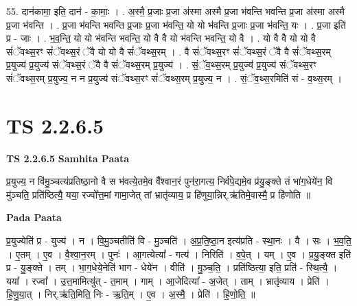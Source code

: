 \documentclass[17pt]{extarticle}
\begin{document}
55. दान॑कामा॒ इति॒ दान॑ - का॒माः॒ । . अ॒स्मै॒ प्र॒जाः प्र॒जा अ॑स्मा अस्मै प्र॒जा भ॑वन्ति भवन्ति प्र॒जा अ॑स्मा अस्मै प्र॒जा भ॑वन्ति । . प्र॒जा भ॑वन्ति भवन्ति प्र॒जाः प्र॒जा भ॑वन्ति॒ यो यो भ॑वन्ति प्र॒जाः प्र॒जा भ॑वन्ति॒ यः । . प्र॒जा इति॑ प्र - जाः । . भ॒व॒न्ति॒ यो यो भ॑वन्ति भवन्ति॒ यो वै वै यो भ॑वन्ति भवन्ति॒ यो वै । . यो वै वै यो यो वै सं॑ॅवथ्स॒रꣳ सं॑ॅवथ्स॒रं ॅवै यो यो वै सं॑ॅवथ्स॒रम् । . वै सं॑ॅवथ्स॒रꣳ सं॑ॅवथ्स॒रं ॅवै वै सं॑ॅवथ्स॒रम् प्र॒युज्य॑ प्र॒युज्य॑ संॅवथ्स॒रं ॅवै वै सं॑ॅवथ्स॒रम् प्र॒युज्य॑ । . सं॒ॅव॒थ्स॒रम् प्र॒युज्य॑ प्र॒युज्य॑ संॅवथ्स॒रꣳ सं॑ॅवथ्स॒रम् प्र॒युज्य॒ न न प्र॒युज्य॑ संॅवथ्स॒रꣳ सं॑ॅवथ्स॒रम् प्र॒युज्य॒ न । . सं॒ॅव॒थ्स॒रमिति॑ सं - व॒थ्स॒रम् । \newline
\pagebreak
{}

\section{ TS 2.2.6.5 }

\textbf{TS 2.2.6.5 } \newline
\textbf{Samhita Paata} \newline

प्र॒युज्य॒ न वि॑मु॒ञ्चत्य॑प्रतिष्ठा॒नो वै स भ॑वत्ये॒तमे॒व वै᳚श्वान॒रं पुन॑रा॒गत्य॒ निर्व॑पे॒द्यमे॒व प्र॑यु॒ङ्क्ते तं भा॑ग॒धेये॑न॒ वि मु॑ञ्चति॒ प्रति॑ष्ठित्यै॒ यया॒ रज्वो᳚त्त॒मां गामा॒जेत् तां भ्रातृ॑व्याय॒ प्र हि॑णुया॒न्निर्.ऋ॑तिमे॒वास्मै॒ प्र हि॑णोति ॥ \newline

\textbf{Pada Paata} \newline

प्र॒युज्येति॑ प्र - युज्य॑ । न । वि॒मु॒ञ्चतीति॑ वि - मु॒ञ्चति॑ । अ॒प्र॒ति॒ष्ठा॒न इत्य॑प्रति - स्था॒नः । वै । सः । भ॒व॒ति॒ । ए॒तम् । ए॒व । वै॒श्वा॒न॒रम् । पुनः॑ । आ॒गत्येत्या᳚ - गत्य॑ । निरिति॑ । व॒पे॒त् । यम् । ए॒व । प्र॒यु॒ङ्क्त इति॑ प्र - यु॒ङ्क्ते । तम् । भा॒ग॒धेये॒नेति॑ भाग - धेये॑न । वीति॑ । मु॒ञ्च॒ति॒ । प्रति॑ष्ठित्या॒ इति॒ प्रति॑ - स्थि॒त्यै॒ । यया᳚ । रज्वा᳚ । उ॒त्त॒मामित्यु॑त् - त॒माम् । गाम् । आ॒जेदित्या᳚ - अ॒जेत् । ताम् । भ्रातृ॑व्याय । प्रेति॑ । हि॒णु॒या॒त् । निर्.ऋ॑ति॒मिति॒ निः - ऋ॒ति॒म् । ए॒व । अ॒स्मै॒ । प्रेति॑ । हि॒णो॒ति॒ ॥  \newline
\end{document}

